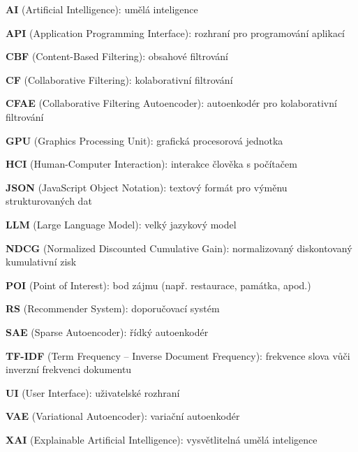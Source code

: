 \documentclass[12pt,a4paper]{report}
\begin{document}



\tableofcontents






% 

% 

% 




\begin{description}
    \item \textbf{AI} (Artificial Intelligence): umělá inteligence
    \item \textbf{API} (Application Programming Interface): rozhraní pro programování aplikací
    \item \textbf{CBF} (Content-Based Filtering): obsahové filtrování
    \item \textbf{CF} (Collaborative Filtering): kolaborativní filtrování
    \item \textbf{CFAE} (Collaborative Filtering Autoencoder): autoenkodér pro kolaborativní filtrování
    \item \textbf{GPU} (Graphics Processing Unit): grafická procesorová jednotka
    \item \textbf{HCI} (Human-Computer Interaction): interakce člověka s počítačem
    \item \textbf{JSON} (JavaScript Object Notation): textový formát pro výměnu strukturovaných dat
    \item \textbf{LLM} (Large Language Model): velký jazykový model
    \item \textbf{NDCG} (Normalized Discounted Cumulative Gain): normalizovaný diskontovaný kumulativní zisk
    \item \textbf{POI} (Point of Interest): bod zájmu (např. restaurace, památka, apod.)
    \item \textbf{RS} (Recommender System): doporučovací systém
    \item \textbf{SAE} (Sparse Autoencoder): řídký autoenkodér
    \item \textbf{TF-IDF} (Term Frequency -- Inverse Document Frequency): frekvence slova vůči inverzní frekvenci dokumentu
    \item \textbf{UI} (User Interface): uživatelské rozhraní
    \item \textbf{VAE} (Variational Autoencoder): variační autoenkodér
    \item \textbf{XAI} (Explainable Artificial Intelligence): vysvětlitelná umělá inteligence
\end{description}
\end{document}
